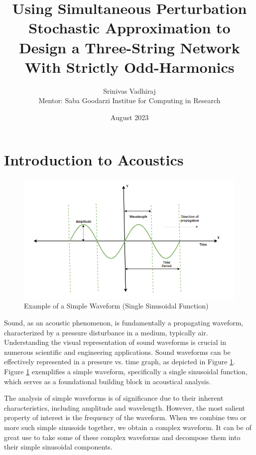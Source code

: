 \documentclass[12pt]{article}
\title{Using Simultaneous Perturbation Stochastic Approximation to Design a Three-String Network With Strictly Odd-Harmonics}
\author{Srinivas Vadhiraj\\
\AND
Mentor: Saba Goodarzi
\AND
\AND
\AND
\AND
	Institue for Computing in Research\\
\AND
}
\date{August 2023}
\begin{document}
\maketitle

\newpage
\tableofcontents
\thispagestyle{empty}





\newpage
\setcounter{page}{1}
\section{Introduction to Acoustics}
\begin{figure}[htbp]
    \centering
    \includegraphics[width=\textwidth,height=.6\textheight,keepaspectratio]{diagram.png}
    \caption{Example of a Simple Waveform (Single Sinusoidal Function)}
    \label{fig:simple_waveform}
\end{figure}

Sound, as an acoustic phenomenon, is fundamentally a propagating waveform, characterized by a pressure disturbance in a medium, typically air. Understanding the visual representation of sound waveforms is crucial in numerous scientific and engineering applications. Sound waveforms can be effectively represented in a pressure vs. time graph, as depicted in Figure \ref{fig:simple_waveform}. Figure \ref{fig:simple_waveform} exemplifies a simple waveform, specifically a single sinusoidal function, which serves as a foundational building block in acoustical analysis.

The analysis of simple waveforms is of significance due to their inherent characteristics, including amplitude and wavelength. However, the most salient property of interest is the frequency of the waveform. When we combine two or more such simple sinusoids together, we obtain a complex waveform. It can be of great use to take some of these complex waveforms and decompose them into their simple sinusoidal components.
\end{document}

